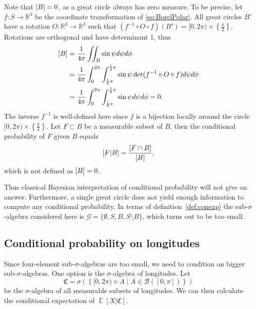 \documentclass[twoside,a4paper]{report}
\theoremstyle{plain}
\theoremstyle{definition}
\theoremstyle{remark}
\numberwithin{equation}{chapter}
\newcommand{\R}{\mathbb{R}}
\let\P\relax
\DeclareMathOperator{\P}{\mathbb{P}}
\DeclareMathOperator{\E}{\mathbb{E}}
\DeclareMathOperator{\1}{\mathbbm{1}}
\renewcommand{\G}{\mathcal{G}}
\newcommand{\B}{\mathcal{B}}
\begin{document}
Note that $\P[B]=0$, as a great circle always has zero measure. To be precise, let $f\colon S\to\R^3$ be the coordinate transformation of \eqref{eq:BorelPolar}. All great circles $B'$ have a rotation $O\colon\R^3\to\R^3$ such that $(f^{-1}\circ O\circ f)(B')=[0,2\pi)\times\left\{\frac{\pi}{2}\right\}$. Rotations are orthogonal and have determinant $1$, thus
\begin{align}
\P[B]&=\frac{1}{4\pi}\iint_B\sin\psi d\psi d\phi\\
&=\frac{1}{4\pi}\int_0^{2\pi}\int_{\frac{1}{2}\pi}^{\frac{1}{2}\pi}\sin\psi \det(f^{-1}\circ O\circ f)d\psi d\phi\\
&=\frac{1}{4\pi}\int_0^{2\pi}\int_{\frac{1}{2}\pi}^{\frac{1}{2}\pi}\sin\psi d\psi d\phi=0.
\end{align}
The inverse $f^{-1}$ is well-defined here since $f$ is a bijection locally around the circle $[0,2\pi)\times\left\{\frac{\pi}{2}\right\}$. Let $F\subset B$ be a measurable subset of $B$, then the conditional probability of $F$ given $B$ equals
\begin{equation}
\P[F|B]=\frac{\P[F\cap B]}{\P[B]},
\end{equation}
which is not defined as $\P[B]=0$.

Thus classical Bayesian interpretation of conditional probability will not give an answer. Furthermore, a single great circle does not yield enough information to compute any conditional probability. In terms of definition~\ref{def:conexp} the sub-$\sigma$-algebra considered here is $\G=\{\emptyset,S,B,S\setminus B\}$, which turns out to be too small.

\subsection{Conditional probability on longitudes}\label{sec:BorelLong}
Since four-element sub-$\sigma$-algebras are too small, we need to condition on bigger sub-$\sigma$-algebras. One option is the $\sigma$-algebra of longitudes. Let
\begin{equation}
\mathfrak{C}=\sigma\left(\left\{[0,2\pi)\times A\mid A\in\B([0,\pi])\right\}\right)
\end{equation}
be the $\sigma$-algebra of all measurable subsets of longitudes. We can then calculate the conditional expectation of $\E[X|\mathfrak{C}]$.
\end{document}

